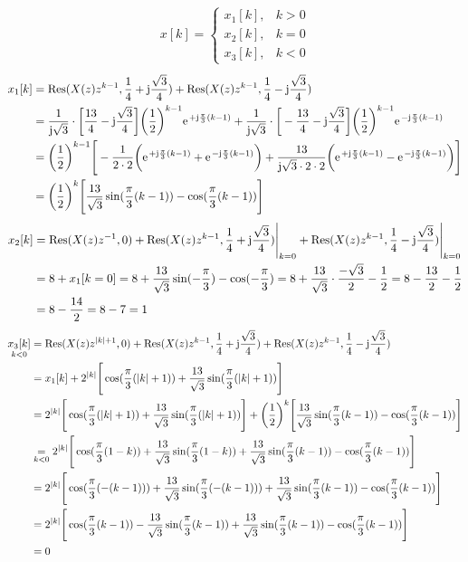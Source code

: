 \documentclass[11pt,a4paper,DIV=12]{scrartcl}
\begin{document}
\begin{align}
	x[k]=\begin{cases}
		x_1[k], &k>0 \\
		x_2[k], &k=0 \\
		x_3[k], &k<0
	\end{cases}
\end{align}
\begin{align}
	x_1[k]&=\mathrm{Res}(X(z)z^{k-1},\frac{1}{4}+\im\frac{\sqrt{3}}{4})+\mathrm{Res}(X(z)z^{k-1},\frac{1}{4}-\im\frac{\sqrt{3}}{4})\nonumber\\
	&=\frac{1}{\im\sqrt{3}}\cdot\bigg [\frac{13}{4}-\im\frac{\sqrt{3}}{4}\bigg]\bigg(\frac{1}{2}\bigg)^{k-1}\e^{+\im\frac{\pi}{3}(k-1)}+\frac{1}{\im\sqrt{3}}\cdot\bigg [-\frac{13}{4}-\im\frac{\sqrt{3}}{4}\bigg]\bigg(\frac{1}{2}\bigg)^{k-1}\e^{-\im\frac{\pi}{3}(k-1)}\nonumber\\
	&=\bigg(\frac{1}{2}\bigg)^{k-1}\Bigg[-\frac{1}{2\cdot2}\bigg(\e^{+\im\frac{\pi}{3}(k-1)}+\e^{-\im\frac{\pi}{3}(k-1)}\bigg)+\frac{13}{\im\sqrt{3}\cdot2\cdot2}\bigg(\e^{+\im\frac{\pi}{3}(k-1)}-\e^{-\im\frac{\pi}{3}(k-1)}\bigg)\Bigg]\nonumber\\
	&=\bigg(\frac{1}{2}\bigg)^{k}\Bigg[\frac{13}{\sqrt{3}}\sin(\frac{\pi}{3}(k-1))-\cos(\frac{\pi}{3}(k-1))\Bigg]
\end{align}
\begin{align}
	x_2[k]&=\mathrm{Res}(X(z)z^{-1},0)+\mathrm{Res}(X(z)z^{k-1},\frac{1}{4}+\im\frac{\sqrt{3}}{4})\Bigg |_{k=0}+\mathrm{Res}(X(z)z^{k-1},\frac{1}{4}-\im\frac{\sqrt{3}}{4})\Bigg |_{k=0}\nonumber\\
	&=8+x_1[k=0]=8+\frac{13}{\sqrt{3}}\sin(-\frac{\pi}{3})-\cos(-\frac{\pi}{3})=8+\frac{13}{\sqrt{3}}\cdot\frac{-\sqrt{3}}{2}-\frac{1}{2}=8-\frac{13}{2}-\frac{1}{2}\nonumber\\
	&=8-\frac{14}{2}=8-7=1
\end{align}
\begin{align}
	\underset{k<0}{x_3[k]}&=\mathrm{Res}(X(z)z^{|k|+1},0)+\mathrm{Res}(X(z)z^{k-1},\frac{1}{4}+\im\frac{\sqrt{3}}{4})+\mathrm{Res}(X(z)z^{k-1},\frac{1}{4}-\im\frac{\sqrt{3}}{4})\nonumber\\
	&=x_1[k]+2^{|k|}\Bigg[\cos(\frac{\pi}{3}(|k|+1))+\frac{13}{\sqrt{3}}\sin(\frac{\pi}{3}(|k|+1))\Bigg]\nonumber\\
	&=2^{|k|}\Bigg[\cos(\frac{\pi}{3}(|k|+1))+\frac{13}{\sqrt{3}}\sin(\frac{\pi}{3}(|k|+1))\Bigg]+\bigg(\frac{1}{2}\bigg)^{k}\Bigg[\frac{13}{\sqrt{3}}\sin(\frac{\pi}{3}(k-1))-\cos(\frac{\pi}{3}(k-1))\Bigg]\nonumber\\
	&\underset{k<0}{=}2^{|k|}\Bigg[\cos(\frac{\pi}{3}(1-k))+\frac{13}{\sqrt{3}}\sin(\frac{\pi}{3}(1-k))+\frac{13}{\sqrt{3}}\sin(\frac{\pi}{3}(k-1))-\cos(\frac{\pi}{3}(k-1))\Bigg]\nonumber\\
	&=2^{|k|}\Bigg[\cos(\frac{\pi}{3}(-(k-1)))+\frac{13}{\sqrt{3}}\sin(\frac{\pi}{3}(-(k-1)))+\frac{13}{\sqrt{3}}\sin(\frac{\pi}{3}(k-1))-\cos(\frac{\pi}{3}(k-1))\Bigg]\nonumber\\
	&=2^{|k|}\Bigg[\cos(\frac{\pi}{3}(k-1))-\frac{13}{\sqrt{3}}\sin(\frac{\pi}{3}(k-1))+\frac{13}{\sqrt{3}}\sin(\frac{\pi}{3}(k-1))-\cos(\frac{\pi}{3}(k-1))\Bigg] \nonumber\\
	&=0
\end{align}
\end{document}
